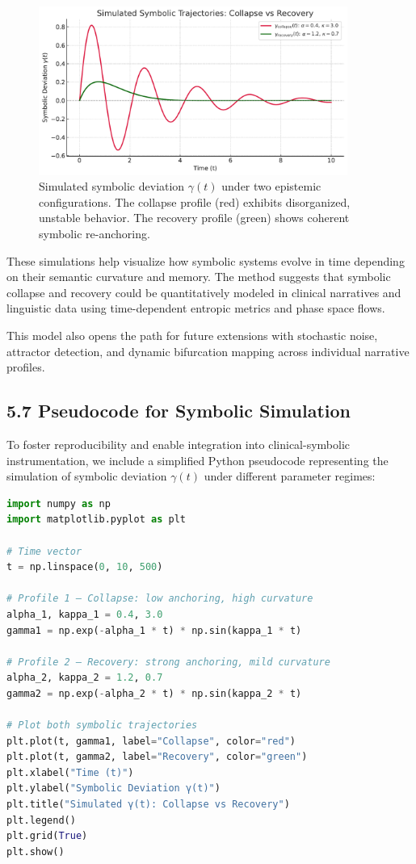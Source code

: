 \begin{figure}[H]
  \centering
  \includegraphics[width=0.9\textwidth]{figs/simulated_gamma_trajectories.pdf}
  \caption{Simulated symbolic deviation $\gamma(t)$ under two epistemic configurations. The collapse profile (red) exhibits disorganized, unstable behavior. The recovery profile (green) shows coherent symbolic re-anchoring.}
  \label{fig:gamma_simulation}
\end{figure}

These simulations help visualize how symbolic systems evolve in time depending on their semantic curvature and memory. The method suggests that symbolic collapse and recovery could be quantitatively modeled in clinical narratives and linguistic data using time-dependent entropic metrics and phase space flows.

This model also opens the path for future extensions with stochastic noise, attractor detection, and dynamic bifurcation mapping across individual narrative profiles.


\subsection*{5.7 Pseudocode for Symbolic Simulation}

To foster reproducibility and enable integration into clinical-symbolic instrumentation, we include a simplified Python pseudocode representing the simulation of symbolic deviation $\gamma(t)$ under different parameter regimes:

\begin{lstlisting}[language=Python, caption={Simulation of $\gamma(t)$ for symbolic collapse and recovery}, label={lst:gamma_simulation}]
import numpy as np
import matplotlib.pyplot as plt

# Time vector
t = np.linspace(0, 10, 500)

# Profile 1 — Collapse: low anchoring, high curvature
alpha_1, kappa_1 = 0.4, 3.0
gamma1 = np.exp(-alpha_1 * t) * np.sin(kappa_1 * t)

# Profile 2 — Recovery: strong anchoring, mild curvature
alpha_2, kappa_2 = 1.2, 0.7
gamma2 = np.exp(-alpha_2 * t) * np.sin(kappa_2 * t)

# Plot both symbolic trajectories
plt.plot(t, gamma1, label="Collapse", color="red")
plt.plot(t, gamma2, label="Recovery", color="green")
plt.xlabel("Time (t)")
plt.ylabel("Symbolic Deviation γ(t)")
plt.title("Simulated γ(t): Collapse vs Recovery")
plt.legend()
plt.grid(True)
plt.show()
\end{lstlisting}

